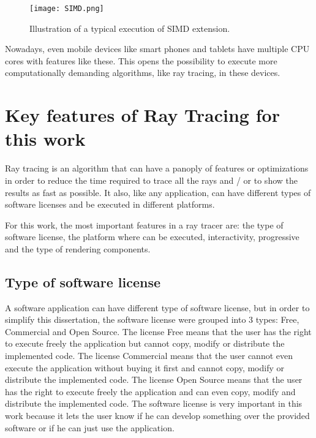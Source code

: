 \begin{figure}[H]
	\centering
	\caption{Illustration of a typical execution of SIMD extension.}
	\label{SIMD.}
	\texttt{[image: SIMD.png]}
\end{figure}

\par
Nowadays, even mobile devices like smart phones and tablets have multiple CPU cores with features like these.
This opens the possibility to execute more computationally demanding algorithms, like ray tracing, in these devices.

\section{Key features of Ray Tracing for this work}

\par
Ray tracing is an algorithm that can have a panoply of features or optimizations in order to reduce the time required to trace all the rays and / or to show the results as fast as possible.
It also, like any application, can have different types of software licenses and be executed in different platforms.

\par
For this work, the most important features in a ray tracer are: the type of software license, the platform where can be executed, interactivity, progressive and the type of rendering components.

\subsection{Type of software license}

\par
A software application can have different type of software license, but in order to simplify this dissertation, the software license were grouped into 3 types: Free, Commercial and Open Source.
The license Free means that the user has the right to execute freely the application but cannot copy, modify or distribute the implemented code.
The license Commercial means that the user cannot even execute the application without buying it first and cannot copy, modify or distribute the implemented code.
The license Open Source means that the user has the right to execute freely the application and can even copy, modify and distribute the implemented code.
The software license is very important in this work because it lets the user know if he can develop something over the provided software or if he can just use the application.

